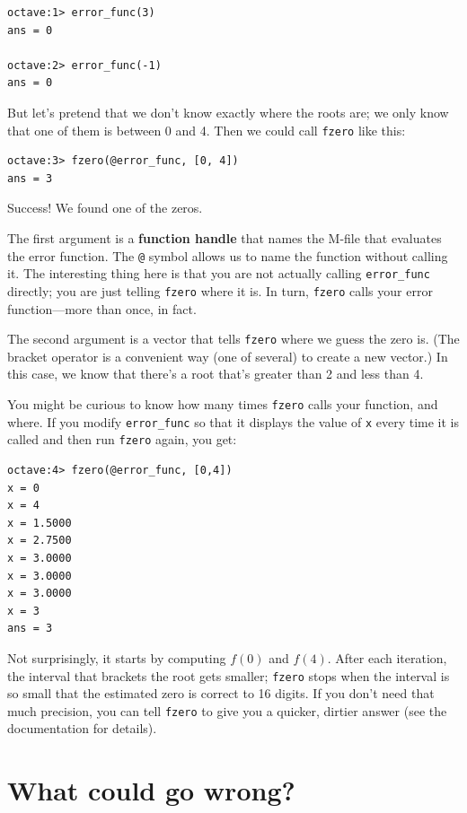 \documentclass{book}
\begin{document}
\begin{verbatim}
octave:1> error_func(3)
ans = 0

octave:2> error_func(-1)
ans = 0
\end{verbatim}

But let's pretend that we don't know exactly where
the roots are; we only know that one of them is between 0 and 4. Then
we could call {\tt fzero} like this:

\begin{verbatim}
octave:3> fzero(@error_func, [0, 4])
ans = 3
\end{verbatim}

Success! We found one of the zeros.

The first argument is a
{\bf function handle} that names the M-file that evaluates
the error function. The {\tt @} symbol allows us to name the
function without calling it. The interesting thing here is
that you are not actually calling {\tt error\_func} directly;
you are just telling {\tt fzero} where it is. In turn, {\tt fzero}
calls your error function---more than once, in fact.

The second argument is a vector that tells {\tt fzero} where we
guess the zero is. (The bracket operator is a convenient way 
(one of several) to create a new vector.) In this case, we know that
there's a root that's greater than 2 and less than 4.

You might be curious to know how many times {\tt fzero} calls your
function, and where. If you modify {\tt error\_func} so that it displays
the value of {\tt x} every time it is called and then run {\tt fzero}
again, you get:

\begin{verbatim}
octave:4> fzero(@error_func, [0,4])
x = 0
x = 4
x = 1.5000
x = 2.7500
x = 3.0000
x = 3.0000
x = 3.0000
x = 3
ans = 3
\end{verbatim}

Not surprisingly, it starts by computing $f(0)$ and $f(4)$. After
each iteration, the interval that brackets the root gets smaller;
{\tt fzero} stops when the interval is so small that the estimated
zero is correct to 16 digits. If you
don't need that much precision, you can tell {\tt fzero} to give
you a quicker, dirtier answer (see the documentation for details).


\section{What could go wrong?}
\end{document}
